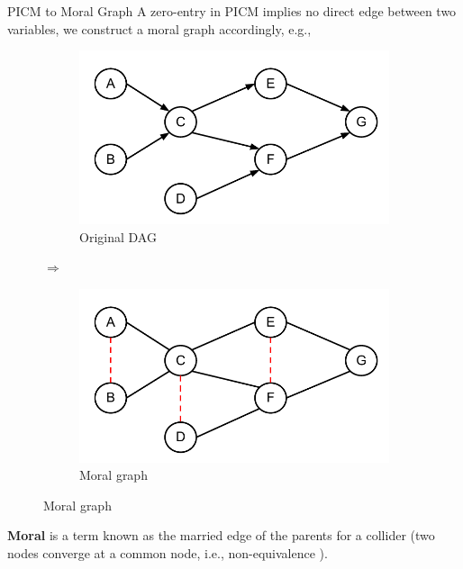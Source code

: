 \begin{frame}{PICM to Moral Graph}
A zero-entry in PICM implies no direct edge between two variables, we construct a moral graph accordingly, e.g., 
\begin{figure}
\setcounter{subfigure}{0}
\begin{subfigure}[H]{0.4\textwidth}
\includegraphics[scale=0.4]{imgs/BNs7n}
\caption{Original DAG}
\end{subfigure}\hfill $\Rightarrow$ \hfill
\begin{subfigure}[H]{0.4\textwidth}
\includegraphics[scale=0.4]{imgs/BNs7nMoral}
\caption{Moral graph}
\end{subfigure}
\end{figure}
\textbf{Moral} is a term known as the married edge of the parents for a collider (two nodes converge at a common node, i.e., non-equivalence ).
\end{frame}
